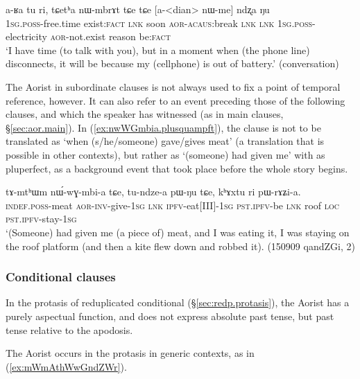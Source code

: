 \begin{exe}
\ex \label{ex:tCetha.nWmbrAt}
 \gll a-ʁa tu ri, tɕetʰa nɯ-mbrɤt tɕe tɕe [a-<dian> nɯ-me] ndʐa ŋu \\
 \textsc{1sg}.\textsc{poss}-free.time exist:\textsc{fact} \textsc{lnk} soon \textsc{aor}-\textsc{acaus}:break \textsc{lnk} \textsc{lnk} \textsc{1sg}.\textsc{poss}-electricity \textsc{aor}-not.exist reason be:\textsc{fact} \\
\glt `I have time (to talk with you), but in a moment when (the phone line) disconnects, it will be because my (cellphone) is out of battery.' (conversation)
\end{exe}

The Aorist in subordinate clauses is not always used to fix a point of temporal reference, however. It can also refer to an event preceding those of the following clauses, and which the speaker has witnessed (as in main clauses, §\ref{sec:aor.main}). In (\ref{ex:nwWGmbia.plusquampft}), the clause  is not to be translated as `when (s/he/someone) gave/gives meat' (a translation that is possible in other contexts), but rather as `(someone) had given me' with as pluperfect, as a background event that took place before the whole story begins.

\begin{exe}
\ex \label{ex:nwWGmbia.plusquampft}
 \gll tɤ-mtʰɯm nɯ́-wɣ-mbi-a tɕe, tu-ndze-a pɯ-ŋu tɕe, kʰɤxtu ri pɯ-rɤʑi-a. \\
 \textsc{indef}.\textsc{poss}-meat \textsc{aor}-\textsc{inv}-give-\textsc{1sg} \textsc{lnk} \textsc{ipfv}-eat[III]-\textsc{1sg} \textsc{pst}.\textsc{ipfv}-be \textsc{lnk} roof \textsc{loc} \textsc{pst}.\textsc{ipfv}-stay-\textsc{1sg} \\
 \glt `(Someone) had given me (a piece of) meat, and I was eating it, I was staying on the roof platform (and then a kite flew down and robbed it). (150909 qandZGi, 2)
\end{exe} 
 
\subsubsection{Conditional clauses }   \label{sec:aor.cond}
In the protasis of reduplicated conditional (§\ref{sec:redp.protasis}), the Aorist has a purely aspectual function, and does not express absolute past tense, but past tense relative to the apodosis.

The Aorist occurs in the protasis in generic contexts, as in (\ref{ex:mWmAthWwGndZWr}).

